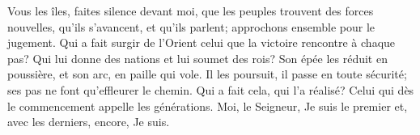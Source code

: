 Vous les îles, faites silence devant moi,
	que les peuples trouvent des forces nouvelles,
	qu’ils s’avancent, et qu’ils parlent;
	approchons ensemble pour le jugement.
Qui a fait surgir de l’Orient celui que la victoire rencontre à chaque pas?
	Qui lui donne des nations et lui soumet des rois?
	Son épée les réduit en poussière,
	et son arc, en paille qui vole.
Il les poursuit, il passe en toute sécurité;
	ses pas ne font qu’effleurer le chemin.
Qui a fait cela, qui l’a réalisé?
	Celui qui dès le commencement appelle les générations.
Moi, le Seigneur, Je suis le premier
	et, avec les derniers, encore, Je suis.
